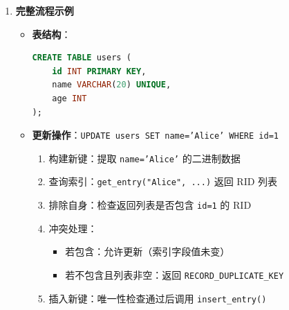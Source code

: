 \documentclass[a4paper, 12pt]{article}
\begin{document}
\begin{enumerate}
\begin{enumerate}
        \item \textbf{排除自身记录}：
        
\begin{itemize}
            \item 遍历返回的 RID 列表
            \item 检查是否包含当前记录的 RID
            \item \textbf{场景}：更新非索引字段时（如唯一索引在 \texttt{id}，更新 \texttt{name}）
        \end{itemize}
        
        \item \textbf{冲突检测}：
        
\begin{itemize}
            \item 若存在其他记录的 RID，返回 \texttt{RC::RECORD\_DUPLICATE\_KEY}
            \item 否则允许更新
        \end{itemize}
    \end{enumerate}
    
    \item \textbf{完整流程示例}
    
\begin{itemize}
        \item \textbf{表结构}：
        \begin{lstlisting}[language=SQL]
CREATE TABLE users (
    id INT PRIMARY KEY,
    name VARCHAR(20) UNIQUE,
    age INT
);
        \end{lstlisting}
        
        \item \textbf{更新操作}：\texttt{UPDATE users SET name='Alice' WHERE id=1}
        
\begin{enumerate}
            \item 构建新键：提取 \texttt{name='Alice'} 的二进制数据
            \item 查询索引：\texttt{get\_entry("Alice", ...)} 返回 RID 列表
            \item 排除自身：检查返回列表是否包含 \texttt{id=1} 的 RID
            \item 冲突处理：
            \begin{itemize}
                \item 若包含：允许更新（索引字段值未变）
                \item 若不包含且列表非空：返回 \texttt{RECORD\_DUPLICATE\_KEY}
            \end{itemize}
            \item 插入新键：唯一性检查通过后调用 \texttt{insert\_entry()}
        \end{enumerate}
    \end{itemize}
\end{enumerate}
\end{document}
